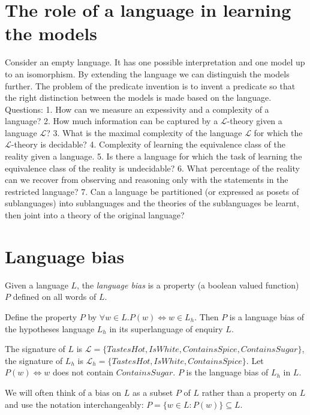 \section{The role of a language in learning the models}
Consider an empty language. It has one possible interpretation and one model up to an isomorphism.
By extending the language we can distinguish the models further. The problem of the predicate invention is to invent a predicate so that the right distinction between the models is made based on the language.
Questions:
1. How can we measure an expessivity and a complexity of a language?
2. How much information can be captured by a $\mathcal{L}$-theory given a language $\mathcal{L}$?
3. What is the maximal complexity of the language $\mathcal{L}$ for which the $\mathcal{L}$-theory is decidable?
4. Complexity of learning the equivalence class of the reality given a language.
5. Is there a language for which the task of learning the equivalence class of the reality is undecidable?
6. What percentage of the reality can we recover from observing and reasoning only with the statements in the restricted language?
7. Can a language be partitioned (or expressed as posets of sublanguages) into sublanguages and the theories of the sublanguages be learnt, then joint into a theory of the original language?

\section{Language bias}
\begin{defn}
Given a language $L$, the \emph{language bias} is a property (a boolean valued function) $P$ defined on all words of $L$.
\end{defn}

\begin{exmp}
Define the property $P$ by $\forall w \in L. P(w) \iff w \in L_h$. Then $P$ is a language bias of the hypotheses language $L_h$ in its superlanguage of enquiry $L$.
\end{exmp}

\begin{exmp}
The signature of $L$ is
$\mathcal{L}=\{TastesHot, IsWhite, ContainsSpice, ContainsSugar\}$,
the signature of $L_h$ is
$\mathcal{L}_h=\{TastesHot, IsWhite, ContainsSpice\}$.
Let $P(w) \iff w$ does not contain $ContainsSugar$. $P$ is the language bias of $L_h$ in $L$.
\end{exmp}

\begin{remark}
We will often think of a bias on $L$ as a subset $P$ of $L$ rather than a property on $L$ and use the notation interchangeably:
$P=\{w \in L : P(w)\} \subseteq L$.
\end{remark}

